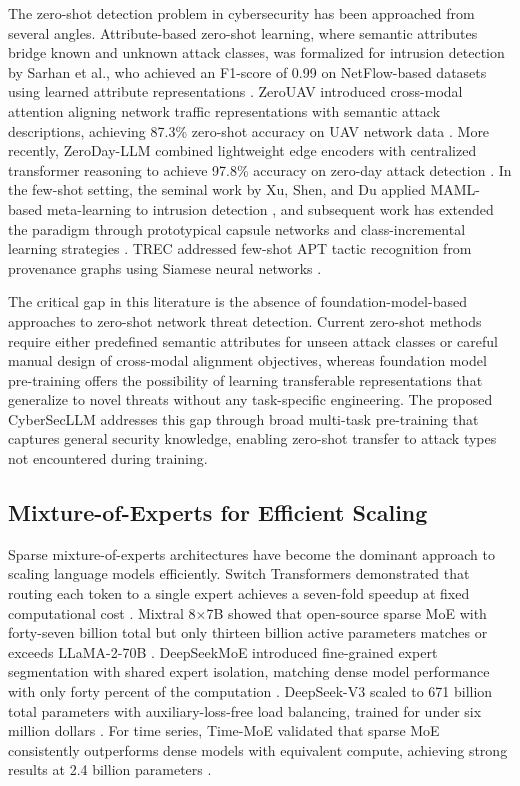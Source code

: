 \documentclass[journal]{IEEEtran}
\newcommand{\modelname}{CyberSecLLM}
\begin{document}
The zero-shot detection problem in cybersecurity has been approached from several angles. Attribute-based zero-shot learning, where semantic attributes bridge known and unknown attack classes, was formalized for intrusion detection by Sarhan et al., who achieved an F1-score of 0.99 on NetFlow-based datasets using learned attribute representations \cite{sarhan2023zeroshot}. ZeroUAV introduced cross-modal attention aligning network traffic representations with semantic attack descriptions, achieving 87.3\% zero-shot accuracy on UAV network data \cite{zerouav2025}. More recently, ZeroDay-LLM combined lightweight edge encoders with centralized transformer reasoning to achieve 97.8\% accuracy on zero-day attack detection \cite{zerodayllm2025}. In the few-shot setting, the seminal work by Xu, Shen, and Du applied MAML-based meta-learning to intrusion detection \cite{xu2020fewshot}, and subsequent work has extended the paradigm through prototypical capsule networks and class-incremental learning strategies \cite{sun2023proto, du2024incremental}. TREC addressed few-shot APT tactic recognition from provenance graphs using Siamese neural networks \cite{trec2024}.

The critical gap in this literature is the absence of foundation-model-based approaches to zero-shot network threat detection. Current zero-shot methods require either predefined semantic attributes for unseen attack classes or careful manual design of cross-modal alignment objectives, whereas foundation model pre-training offers the possibility of learning transferable representations that generalize to novel threats without any task-specific engineering. The proposed \modelname{} addresses this gap through broad multi-task pre-training that captures general security knowledge, enabling zero-shot transfer to attack types not encountered during training.

\subsection{Mixture-of-Experts for Efficient Scaling}
\label{subsec:moe}

Sparse mixture-of-experts architectures have become the dominant approach to scaling language models efficiently. Switch Transformers demonstrated that routing each token to a single expert achieves a seven-fold speedup at fixed computational cost \cite{fedus2022switch}. Mixtral 8$\times$7B showed that open-source sparse MoE with forty-seven billion total but only thirteen billion active parameters matches or exceeds LLaMA-2-70B \cite{jiang2024mixtral}. DeepSeekMoE introduced fine-grained expert segmentation with shared expert isolation, matching dense model performance with only forty percent of the computation \cite{dai2024deepseekmoe}. DeepSeek-V3 scaled to 671 billion total parameters with auxiliary-loss-free load balancing, trained for under six million dollars \cite{deepseekv3}. For time series, Time-MoE validated that sparse MoE consistently outperforms dense models with equivalent compute, achieving strong results at 2.4 billion parameters \cite{shi2024timemoe}.
\end{document}
